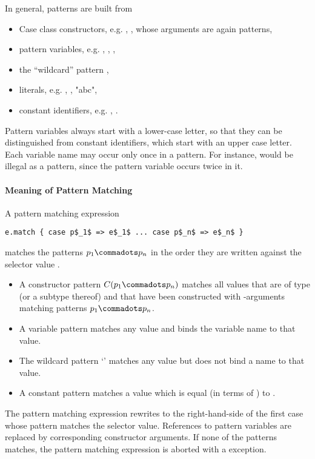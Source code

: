 In general, patterns are built from
\begin{itemize}
\item Case class constructors, e.g. , , whose arguments
      are again patterns,
\item pattern variables, e.g. , , ,
\item the ``wildcard'' pattern \code{_},
\item literals, e.g. , , "abc", 
\item constant identifiers, e.g. , .
\end{itemize}
Pattern variables always start with a lower-case letter, so that they
can be distinguished from constant identifiers, which start with an
upper case letter.  Each variable name may occur only once in a
pattern. For instance,  would be illegal as a pattern,
since the pattern variable  occurs twice in it.

\paragraph{Meaning of Pattern Matching}
A pattern matching expression 
\begin{lstlisting}
e.match { case p$_1$ => e$_1$ ... case p$_n$ => e$_n$ }
\end{lstlisting}
matches the patterns $p_1 \commadots p_n$ in the order they
are written against the selector value .
\begin{itemize}
\item
A constructor pattern $C(p_1 \commadots p_n)$ matches all values that
are of type  (or a subtype thereof) and that have been constructed with 
-arguments matching patterns $p_1 \commadots p_n$.
\item 
A variable pattern  matches any value and binds the variable
name to that value.  
\item 
The wildcard pattern `\code{_}' matches any value but does not bind a name to that value. 
\item A constant pattern  matches a value which is
equal (in terms of \code{==}) to .
\end{itemize}
The pattern matching expression rewrites to the right-hand-side of the
first case whose pattern matches the selector value. References to
pattern variables are replaced by corresponding constructor arguments.
If none of the patterns matches, the pattern matching expression is
aborted with a  exception.

